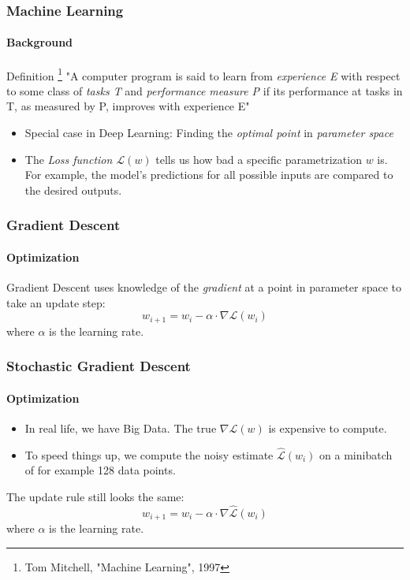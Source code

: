 \documentclass[10pt,usepdftitle=false,aspectratio=169]{beamer}
\renewcommand{\L}{\mathcal{L}}
\begin{document}
\begin{frame}
\frametitle{Machine Learning}
\framesubtitle{Background}
	\begin{block}{Definition \footnote{Tom Mitchell, "Machine Learning", 1997}}
		"A computer program is said to learn from \emph{experience E} with respect to some class of \emph{tasks T} and \emph{performance measure P} if its performance at tasks in T, as measured by P, improves with experience E"
	\end{block}
\begin{itemize}
	\item Special case in Deep Learning: Finding the \emph{optimal point} in \emph{parameter space}
	\item The \emph{Loss function $\L (w)$} tells us how bad a specific parametrization $w$ is. For example, the model's predictions for all possible inputs are compared to the desired outputs.
\end{itemize}
\end{frame}

\begin{frame}
\frametitle{Gradient Descent}
\framesubtitle{Optimization}
	Gradient Descent uses knowledge of the \emph{gradient} at a point in parameter space to take an update step:
		$$ w_{i+1} = w_i - \alpha \cdot \nabla \L(w_i) $$
	where $\alpha$ is the learning rate.
	
\end{frame}

\begin{frame}
\frametitle{Stochastic Gradient Descent}
\framesubtitle{Optimization}
\begin{itemize}
	\item In real life, we have Big Data. The true $\nabla \L(w)$ is expensive to compute.
	\item To speed things up, we compute the noisy estimate $\hat{\L}(w_i)$ on a minibatch of for example 128 data points.
\end{itemize}
The update rule still looks the same:
$$w_{i+1} = w_i - \alpha \cdot \nabla \hat{\L}(w_i) $$
where $\alpha$ is the learning rate.

\end{frame}
\end{document}
